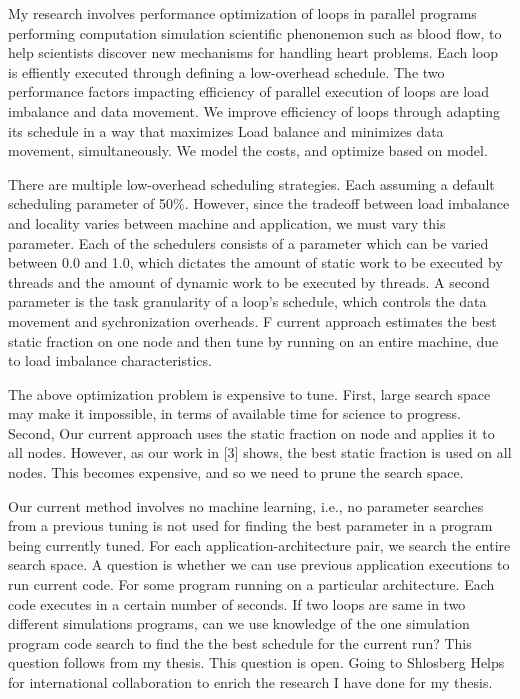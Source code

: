 \documentclass[11pt]{article}
\begin{document}
My research involves performance optimization of
loops in parallel programs performing computation simulation
scientific phenonemon such as blood flow, to help scientists
discover new mechanisms for handling heart problems. 
Each loop is effiently executed through defining a low-overhead
schedule. The two performance factors impacting efficiency of
parallel execution of loops are load imbalance and data movement.  
We improve efficiency of loops through adapting its schedule in a way
that maximizes Load balance and minimizes data movement,
simultaneously. 
We model the costs, and optimize based on model. 

There are multiple low-overhead scheduling strategies. Each assuming a default scheduling parameter of 50\%. However, since the tradeoff
between load imbalance and locality varies between machine and
application, we must vary this parameter. Each of the schedulers
consists of a parameter which can be varied between 0.0 and 1.0, which
dictates the amount of static work to be executed by threads and the
amount of dynamic work to be executed by threads. A second
parameter is the task granularity of a loop's schedule, which
controls the data movement and sychronization overheads. F
current approach estimates the best static fraction on one node and
then tune by running on an entire machine, due to load imbalance
characteristics.

The above optimization problem is expensive to tune.  First, large
search space may make it impossible, in terms of available time for
science to progress. Second, Our current approach uses the static
fraction on node and applies it to all nodes. However, as our work in
[3] shows, the best static fraction is used on all nodes. This
becomes expensive, and so we need to prune the search space. 

Our current method involves no machine learning,
i.e., no parameter searches from a previous tuning is not used for
finding the best parameter in a program being currently tuned. For
each application-architecture pair, we search the entire search
space. A question is whether we can use previous application
executions to run current code. 
For some program running on a particular architecture.
Each code executes in a certain number of seconds. 
If two loops are same in two different simulations programs,
can we use knowledge of the one simulation program code search to
find the the best schedule for the current run? This question follows
from my thesis. This question is open.   Going to Shlosberg Helps for
international collaboration to enrich the research I have done for my
thesis. 

  
  
\end{document}
